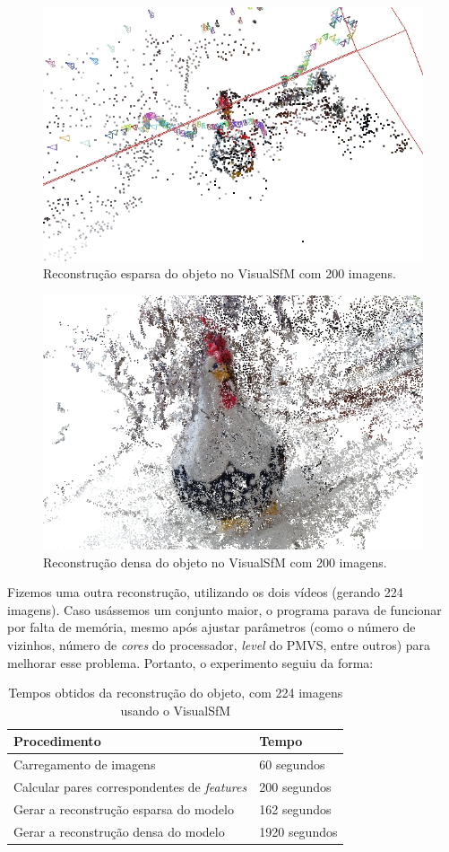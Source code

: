 \begin{figure}[!h]
	\centering
	\includegraphics[width=0.3\linewidth]{figs/galinhasparsa.jpg}
	\caption{%
	Reconstrução esparsa do objeto no VisualSfM com 200 imagens.
	}\label{fig:reconstrucaoEsparsaVisualSFM}
\end{figure}

\begin{figure}[!h]
	\centering
	\includegraphics[width=0.3\linewidth]{figs/galinhadense.jpg}
	\caption{%
	Reconstrução densa do objeto no VisualSfM com 200 imagens.
	}\label{fig:reconstrucaoDensaVisualSFM}
\end{figure}

Fizemos uma outra reconstrução, utilizando os dois vídeos (gerando 224 imagens). Caso usássemos um conjunto maior, o programa parava de funcionar por falta de memória, mesmo após ajustar parâmetros (como o número de vizinhos, número de \emph{cores} do processador, \emph{level} do PMVS, entre outros) para melhorar esse problema. Portanto, o experimento seguiu da forma:

\begin{table}[h!]
\caption{Tempos obtidos da reconstrução do objeto, com 224 imagens usando o VisualSfM}
\label{tab:temposSfM224}
\begin{tabular}{|l|p{4.7cm}|}
\hline
Procedimento & Tempo \\ \hline
Carregamento de imagens & 60 segundos \\ \hline
Calcular pares correspondentes de \emph{features} & 200 segundos \\ \hline
Gerar a reconstrução esparsa do modelo & 162 segundos \\ \hline
Gerar a reconstrução densa do modelo & 1920 segundos \\ \hline
\end{tabular}
\end{table}


